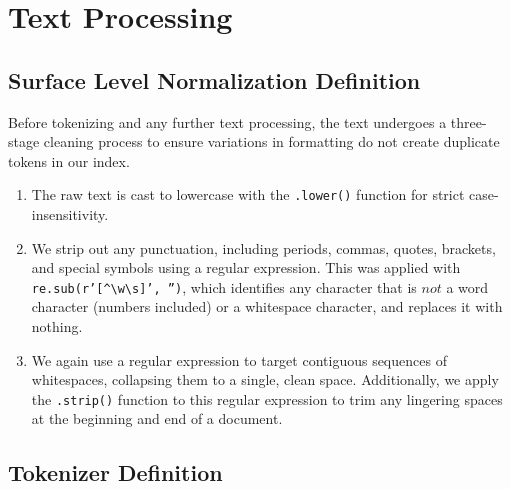 \clearpage
\section*{Text Processing}
{}

\subsection*{Surface Level Normalization Definition}
{}

Before tokenizing and any further text processing, the text undergoes a 
three-stage cleaning process to ensure variations in formatting do not create 
duplicate tokens in our index. 
\begin{enumerate}
    \item   The raw text is cast to lowercase with the \texttt{.lower()} 
            function for strict case-insensitivity.
    \item   We strip out any punctuation, including periods, commas, quotes, 
            brackets, and special symbols using a regular expression. This was 
            applied with 
            \texttt{re.sub(r'[\textasciicircum \textbackslash w\textbackslash s]',
            '')}, which identifies any character that is $not$ a word 
            character (numbers included) or a whitespace character, and replaces
            it with nothing. 
    \item   We again use a regular expression to target contiguous sequences  
            of whitespaces, collapsing them to a single, clean space. 
            Additionally, we apply the \texttt{.strip()} function to this 
            regular expression to trim any lingering spaces at the beginning 
            and end of a document. 
\end{enumerate}


\subsection*{Tokenizer Definition}
{}

